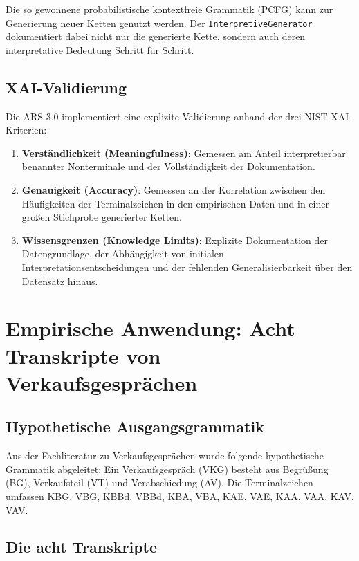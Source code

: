 \documentclass[
  12pt,
  a4paper,
  oneside,
  titlepage
]{article}
\begin{document}
Die so gewonnene probabilistische kontextfreie Grammatik (PCFG) kann zur 
Generierung neuer Ketten genutzt werden. Der \texttt{InterpretiveGenerator} 
dokumentiert dabei nicht nur die generierte Kette, sondern auch deren 
interpretative Bedeutung Schritt für Schritt.

\subsection{XAI-Validierung}

Die ARS 3.0 implementiert eine explizite Validierung anhand der drei 
NIST-XAI-Kriterien:

\begin{enumerate}
    \item \textbf{Verständlichkeit (Meaningfulness)}: Gemessen am Anteil 
    interpretierbar benannter Nonterminale und der Vollständigkeit der 
    Dokumentation.
    
    \item \textbf{Genauigkeit (Accuracy)}: Gemessen an der Korrelation zwischen 
    den Häufigkeiten der Terminalzeichen in den empirischen Daten und in einer 
    großen Stichprobe generierter Ketten.
    
    \item \textbf{Wissensgrenzen (Knowledge Limits)}: Explizite Dokumentation 
    der Datengrundlage, der Abhängigkeit von initialen Interpretationsentscheidungen 
    und der fehlenden Generalisierbarkeit über den Datensatz hinaus.
\end{enumerate}

\section{Empirische Anwendung: Acht Transkripte von Verkaufsgesprächen}

\subsection{Hypothetische Ausgangsgrammatik}

Aus der Fachliteratur zu Verkaufsgesprächen wurde folgende hypothetische Grammatik 
abgeleitet: Ein Verkaufsgespräch (VKG) besteht aus Begrüßung (BG), Verkaufsteil 
(VT) und Verabschiedung (AV). Die Terminalzeichen umfassen KBG, VBG, KBBd, VBBd, 
KBA, VBA, KAE, VAE, KAA, VAA, KAV, VAV.

\subsection{Die acht Transkripte}
\end{document}
